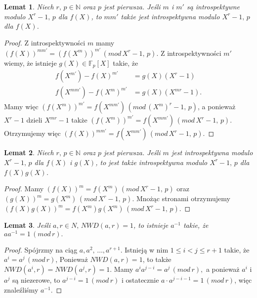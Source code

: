\documentclass[declaration,shortabstract]{iithesis}
\theoremstyle{definition}
\theoremstyle{remark} \newtheorem{observation}{Obserwacja}
\theoremstyle{plain} \newtheorem{theorem}{Twierdzenie}
\theoremstyle{plain} \newtheorem{lemma}{Lemat}
\theoremstyle{remark} \newtheorem*{remark*}{Uwaga}
\theoremstyle{reminder} \newtheorem*{reminder*}{Przypomnienie}
\begin{document}
\begin{lemma}\label{intro1}
	Niech $r, \, p \in \mathbb{N}$ oraz $p$ jest pierwsza. Jeśli $m$ i $m'$ są introspektywne modulo $X^r - 1, \, p$ dla $f(X)$, to $mm'$ także jest introspektywna modulo $X^r - 1, \, p$ dla $f(X)$.
\end{lemma}
	
\begin{proof}
	Z introspektywności $m$ mamy $(f(X))^{mm'} = (f(X^m))^{m'} \, (mod \, X^r - 1, \, p).$ Z introspektywności $m'$ wiemy, że istnieje $g(X) \in \mathbb{F}_p[X]$ takie, że 
	\begin{align*}
		f(X^{m'}) - {f(X)}^{m'}    & = g(X)(X^r - 1)     \\
		f(X^{mm'}) - {f(X^m)}^{m'} & = g(X)(X^{mr} - 1). 
	\end{align*}
	Mamy więc $(f(X^m))^{m'} = f(X^{mm'}) \, (mod \, (X^m)^r - 1, \, p)$, a ponieważ $X^r - 1$ dzieli $X^{mr} - 1$ także $(f(X^m))^{m'} = f(X^{mm'}) \, (mod \, X^r - 1, \, p)$. Otrzymujemy więc $(f(X))^{mm'} = f(X^{mm'}) \, (mod \, X^r - 1, \, p)$.
\end{proof}
	
\begin{lemma}\label{intro2}
	Niech $r, \, p \in \mathbb{N}$ oraz $p$ jest pierwsza. Jeśli $m$ jest introspektywna modulo $X^r - 1, \, p$ dla $f(X)$ i $g(X)$, to jest także introspektywna modulo $X^r - 1, \, p$ dla $f(X)g(X)$.
\end{lemma}
	
\begin{proof}
	Mamy $(f(X))^m = f(X^m) \, (mod \, X^r - 1, \, p)$ oraz $(g(X))^m = g(X^m) \, (mod \, X^r - 1, \, p)$. Mnożąc stronami otrzymujemy $(f(X)g(X))^m = f(X^m)g(X^m) \, (mod \, X^r - 1, \, p)$.
\end{proof}
	
	
\begin{lemma}\label{odwrotny}
	Jeśli $a, r \in N, \, NWD(a, r) = 1$, to istnieje $a^{-1}$ takie, że $aa^{-1} = 1 \, (mod \, r).$
\end{lemma}
	
\begin{proof}
	Spójrzmy na ciąg $a, a^2, \, \dots, a^{r+1}$. Istnieją w nim $1 \leq i < j \leq r + 1$ takie, że $a^i = a^j \, (mod \, r)$, Ponieważ $NWD(a, r) = 1$, to także $NWD(a^i, r) = NWD(a^j, r) = 1$. Mamy $a^ia^{j-i} = a^j \, (mod \, r),$ a ponieważ $a^i$ i $a^j$ są niezerowe, to $a^{j - i} = 1 \, (mod \, r)$ i ostatecznie $a \cdot a^{j - i - 1} = 1 \, (mod \, r)$, więc znaleźliśmy $a^{-1}$.
\end{proof}
	
\end{document}
